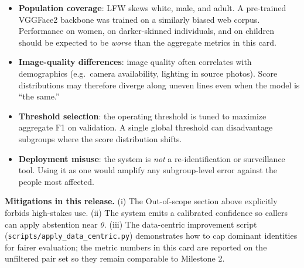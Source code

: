 \documentclass[11pt]{article}
\begin{document}
\begin{itemize}[noitemsep, leftmargin=*]
    \item \textbf{Population coverage}: LFW skews white, male, and adult. A
    pre-trained VGGFace2 backbone was trained on a similarly biased web corpus.
    Performance on women, on darker-skinned individuals, and on children should be
    expected to be \emph{worse} than the aggregate metrics in this card.
    \item \textbf{Image-quality differences}: image quality often correlates with
    demographics (e.g.\ camera availability, lighting in source photos). Score
    distributions may therefore diverge along uneven lines even when the model is
    ``the same.''
    \item \textbf{Threshold selection}: the operating threshold is tuned to maximize
    aggregate F1 on validation. A single global threshold can disadvantage subgroups
    where the score distribution shifts.
    \item \textbf{Deployment misuse}: the system is \emph{not} a re-identification
    or surveillance tool. Using it as one would amplify any subgroup-level error
    against the people most affected.
\end{itemize}

\textbf{Mitigations in this release.}
(i) The Out-of-scope section above explicitly forbids high-stakes use.
(ii) The system emits a calibrated confidence so callers can apply abstention near
$\theta$.
(iii) The data-centric improvement script (\texttt{scripts/apply\_data\_centric.py})
demonstrates how to cap dominant identities for fairer evaluation; the metric numbers
in this card are reported on the unfiltered pair set so they remain comparable to
Milestone 2.
\end{document}
